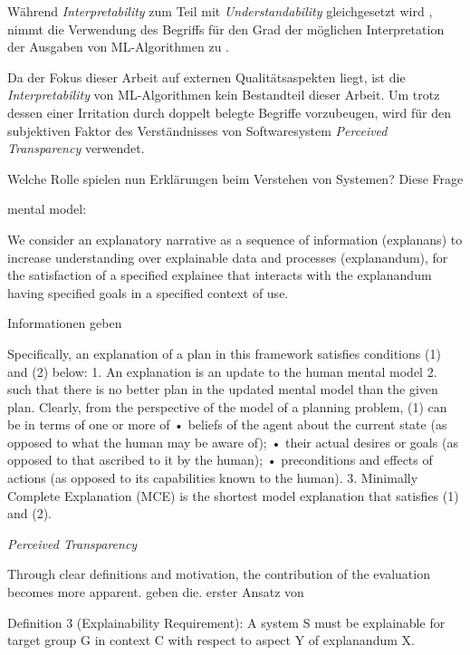 Während \textit{Interpretability} zum Teil mit \textit{Understandability} gleichgesetzt wird \cite{chazette_end-users_nodate}, nimmt die Verwendung des Begriffs für den Grad der möglichen Interpretation der Ausgaben von ML-Algorithmen zu \cite{doshi2017towards}.

Da der Fokus dieser Arbeit auf externen Qualitätsaspekten liegt, ist die \textit{Interpretability} von ML-Algorithmen kein Bestandteil dieser Arbeit. Um trotz dessen einer Irritation durch doppelt belegte Begriffe vorzubeugen, wird für den subjektiven Faktor des Verständnisses von Softwaresystem \textit{Perceived Transparency} verwendet.

\bigskip

Welche Rolle spielen nun Erklärungen beim Verstehen von Systemen? Diese Frage 

mental model: \cite{chi_three_nodate}

We consider an explanatory narrative as a sequence of information (explanans) to increase understanding over explainable data and processes (explanandum), for the satisfaction of a specified explainee that interacts with the explanandum having specified goals in a specified context of use. \cite{sovrano_modelling_2020}

Informationen geben \cite{wang_integration_2020}

Specifically, an explanation of a plan in this framework satisfies conditions (1) and (2) below: 1. An explanation is an update to the human mental model 2. such that there is no better plan in the updated mental model than the given plan. Clearly, from the perspective of the model of a planning problem, (1) can be in terms of one or more of • beliefs of the agent about the current state (as opposed to what the human may be aware of); • their actual desires or goals (as opposed to that ascribed to it by the human); • preconditions and effects of actions (as opposed to its capabilities known to the human). 3. Minimally Complete Explanation (MCE) is the shortest model explanation that satisfies (1) and (2). \cite{zahedi_towards_2019}

\textit{Perceived Transparency} \cite{wang_is_2018,balog_measuring_2020}

\glqq Through clear definitions and motivation, the contribution of the evaluation becomes more apparent. \grqq{} \cite{waa_evaluating_2021} \cite{chazette_knowledge_nodate} geben die. erster Ansatz von \cite{kohl_explainability_2019}

Definition 3 (Explainability Requirement): A system S must be explainable for target group G in context C with respect to aspect Y of explanandum X. \cite{kohl_explainability_2019}

